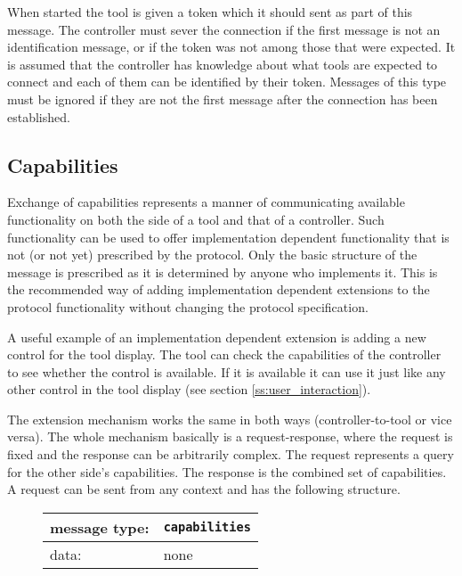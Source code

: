 \documentclass{article}
\newcommand{\msg}[1]{\texttt{#1}}
\begin{document}
   \noindent When started the tool is given a token which it should sent as
   part of this message. The controller must sever the connection if the first
   message is not an identification message, or if the token was not among
   those that were expected. It is assumed that the controller has knowledge
   about what tools are expected to connect and each of them can be identified
   by their token.  Messages of this type must be ignored if they are not the
   first message after the connection has been established.

  \subsection{Capabilities}

   Exchange of capabilities represents a manner of communicating available
   functionality on both the side of a tool and that of a controller.  Such
   functionality can be used to offer implementation dependent functionality
   that is not (or not yet) prescribed by the protocol. Only the basic
   structure of the message is prescribed as it is determined by anyone who
   implements it. This is the recommended way of adding implementation
   dependent extensions to the protocol functionality without changing the
   protocol specification.

   A useful example of an implementation dependent extension is adding a new
   control for the tool display. The tool can check the capabilities of the
   controller to see whether the control is available. If it is available it
   can use it just like any other control in the tool display (see section
   \ref{ss:user_interaction}).

   The extension mechanism works the same in both ways (controller-to-tool or
   vice versa). The whole mechanism basically is a request-response, where the
   request is fixed and the response can be arbitrarily complex. The request
   represents a query for the other side's capabilities. The response is the
   combined set of capabilities. A request can be sent from any context and has
   the following structure.

   \begin{figure}[H]
    \begin{center}
     \begin{tabular}{|ll|}
      \hline
      message type:    & \msg{capabilities} \\
      \hline
      data:            & none \\
      \hline
     \end{tabular}
    \end{center}
   \end{figure}
\end{document}
